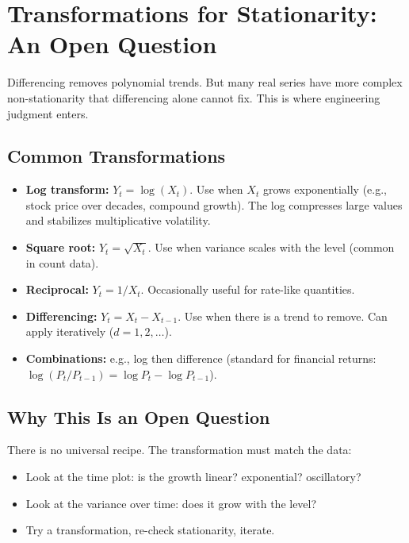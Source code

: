 \documentclass[11pt]{article}
\begin{document}
\section{Transformations for Stationarity: An Open Question}

Differencing removes polynomial trends. But many real series have more
complex non-stationarity that differencing alone cannot fix. This is where
engineering judgment enters.

\subsection{Common Transformations}
\begin{itemize}
    \item \textbf{Log transform:} $Y_t = \log(X_t)$. Use when $X_t$ grows
      exponentially (e.g., stock price over decades, compound growth). The log
      compresses large values and stabilizes multiplicative volatility.
    \item \textbf{Square root:} $Y_t = \sqrt{X_t}$. Use when variance scales
      with the level (common in count data).
    \item \textbf{Reciprocal:} $Y_t = 1/X_t$. Occasionally useful for
      rate-like quantities.
    \item \textbf{Differencing:} $Y_t = X_t - X_{t-1}$. Use when there is
      a trend to remove. Can apply iteratively ($d = 1, 2, \ldots$).
    \item \textbf{Combinations:} e.g., log then difference (standard for
      financial returns: $\log(P_t/P_{t-1}) = \log P_t - \log P_{t-1}$).
\end{itemize}

\subsection{Why This Is an Open Question}
There is no universal recipe. The transformation must match the data:
\begin{itemize}
    \item Look at the time plot: is the growth linear? exponential?
      oscillatory?
    \item Look at the variance over time: does it grow with the level?
    \item Try a transformation, re-check stationarity, iterate.
\end{itemize}
\end{document}
